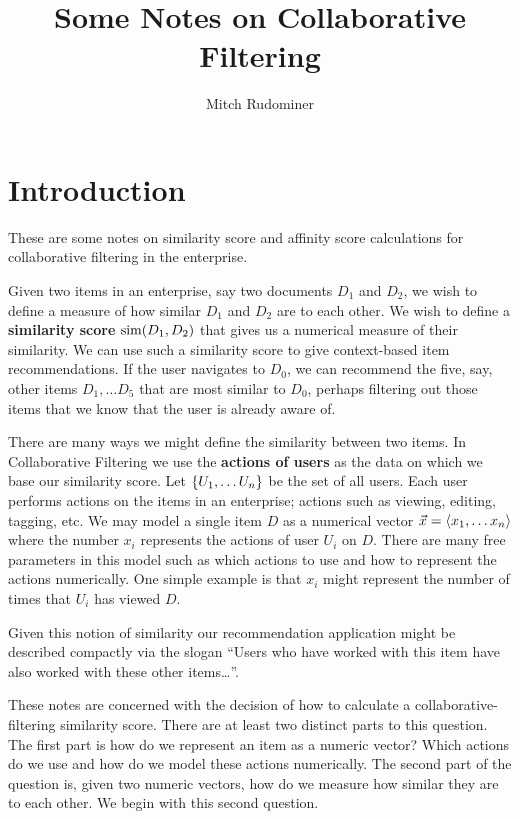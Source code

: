 \documentclass{article}
\newcommand{\skipsmall}{\vspace{1em}}
\begin{document}
\title{Some Notes on Collaborative Filtering}
\author{Mitch Rudominer}

\maketitle

\section{Introduction}
These are some notes on similarity score and affinity score calculations for
collaborative filtering in the enterprise.

\skipsmall
Given two items in an enterprise, say two documents $D_1$ and $D_2$,
we wish to define a measure of how similar $D_1$ and $D_2$ are to each other. We
wish to define a \textbf{similarity score} $\operatorname{sim}(D_1,D_2)$ that gives us a
numerical measure of their similarity. We can use such a similarity score to
give context-based item recommendations. If the user navigates to $D_0$, we can
recommend the five, say, other items $D_1,\dots D_5$ that are most similar to
$D_0$, perhaps filtering out those items that we know that the user is already 
aware of. 

There are many ways we might define the similarity between two items. In
Collaborative Filtering we use the \textbf{actions of users} as the data on
which we base our similarity score. Let $\left\{U_1,\dots U_n\right\}$ be the set
of all users. Each user performs actions on the items in an enterprise; actions
such as viewing, editing, tagging, etc. We may model a single item $D$ as a
numerical vector $\vec{x}=\left\langle x_1,\dots x_n \right\rangle$ where the number $x_i$
represents the actions of user $U_i$ on $D$. There are many free parameters in
this model such as which actions to use and how to represent the actions
numerically. One simple example is that $x_i$ might represent the number of
times that $U_i$ has viewed $D$.

Given this notion of similarity our recommendation application might be
described compactly via the slogan ``Users who have worked with this item have
also worked with these other items\ldots''.

These notes are concerned with the decision of how to calculate a
collaborative-filtering similarity score. There are at least two distinct parts
to this question. The first part is how do we represent an item as a numeric
vector? Which actions do we use and how do we model these actions numerically.
The second part of the question is, given two numeric vectors, how do we measure
how similar they are to each other. We begin with this second question.
\end{document}
